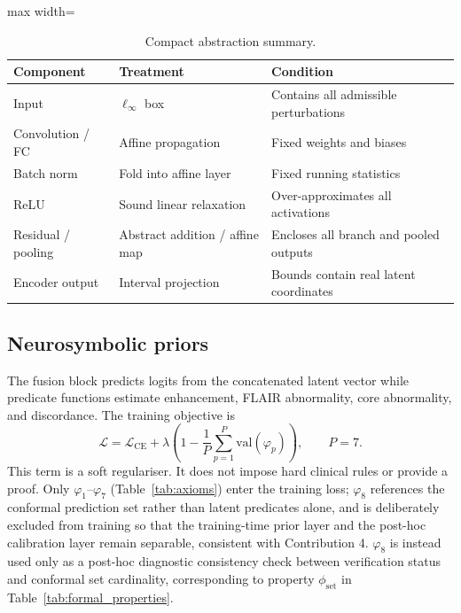\documentclass[preprint,11pt]{elsarticle}
\begin{document}
\begin{table}[H]
\centering
\caption{Compact abstraction summary.}
\label{tab:abstraction_layers}
\scriptsize
\begin{adjustbox}{max width=\textwidth}
\begin{tabular}{p{3.3cm}p{5.6cm}p{5.2cm}}
\toprule
\textbf{Component} & \textbf{Treatment} & \textbf{Condition} \\
\midrule
Input & $\ell_\infty$ box & Contains all admissible perturbations \\
Convolution / FC & Affine propagation & Fixed weights and biases \\
Batch norm & Fold into affine layer & Fixed running statistics \\
ReLU & Sound linear relaxation & Over-approximates all activations \\
Residual / pooling & Abstract addition / affine map & Encloses all branch and pooled outputs \\
Encoder output & Interval projection & Bounds contain real latent coordinates \\
\bottomrule
\end{tabular}
\end{adjustbox}
\end{table}

\subsection{Neurosymbolic priors}
\label{subsec:axioms_independence}

The fusion block predicts logits from the concatenated latent vector while predicate functions estimate enhancement, FLAIR abnormality, core abnormality, and discordance. The training objective is
\begin{equation}
\mathcal{L}=\mathcal{L}_{\mathrm{CE}}+\lambda\left(1-\frac{1}{P}\sum_{p=1}^{P}\mathrm{val}(\varphi_p)\right),\qquad P=7.
\label{eq:neurosymbolic_loss}
\end{equation}
This term is a soft regulariser. It does not impose hard clinical rules or provide a proof. Only $\varphi_1$--$\varphi_7$ (Table~\ref{tab:axioms}) enter the training loss; $\varphi_8$ references the conformal prediction set rather than latent predicates alone, and is deliberately excluded from training so that the training-time prior layer and the post-hoc calibration layer remain separable, consistent with Contribution 4. $\varphi_8$ is instead used only as a post-hoc diagnostic consistency check between verification status and conformal set cardinality, corresponding to property $\phi_{\mathrm{set}}$ in Table~\ref{tab:formal_properties}.
\end{document}
